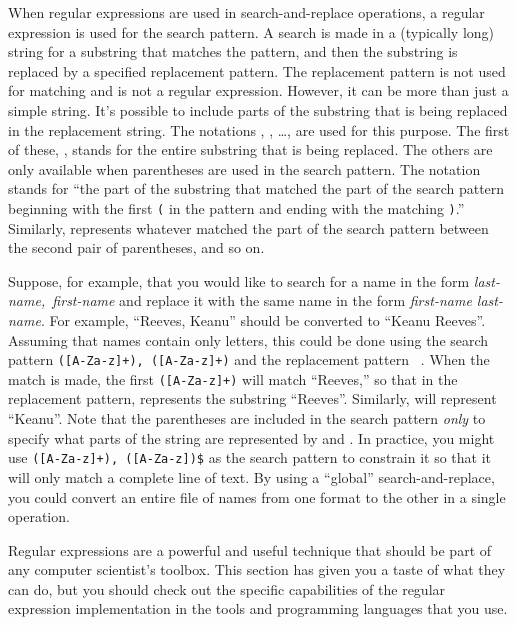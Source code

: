 When regular expressions are used in search-and-replace operations,
a regular expression is used for the search pattern.  A search is
made in a (typically long) string for a substring that matches the pattern,
and then the substring is replaced by a specified replacement
pattern.  The replacement pattern is not used for matching
and is not a regular expression.  However, it can be more than
just a simple string.  It's possible to include parts of the
substring that is being replaced in the replacement string.
The notations \texttt{}, \texttt{}, \dots, \texttt{}
are used for this purpose.  The first of these, \texttt{},
stands for the entire substring that is being replaced.
The others are only available when parentheses are used in
the search pattern.  The notation \texttt{} stands for
``the part of the substring that matched the part of the
search pattern beginning with the first \texttt{(} in the
pattern and ending with the matching \texttt{)}.''  Similarly,
\texttt{} represents whatever matched the part of the
search pattern between the second pair of parentheses, and so on.

Suppose, for example, that you would like to search for
a name in the form \textit{last-name,~first-name} and
replace it with the same name in the form \textit{first-name last-name}.
For example, ``Reeves, Keanu'' should be converted to ``Keanu Reeves''.
Assuming that names contain only letters,
this could be done using the search pattern \texttt{([A-Za-z]+),~([A-Za-z]+)}
and the replacement pattern \texttt{ }.  When the match is
made, the first \texttt{([A-Za-z]+)} will match ``Reeves,'' 
so that in the replacement pattern, \texttt{} represents the
substring ``Reeves''. Similarly, \texttt{} will represent
``Keanu''.  Note that the parentheses
are included in the search pattern \textit{only} to specify what parts
of the string are represented by \texttt{} and \texttt{}.
In practice, you might use \texttt{\sol([A-Za-z]+),~([A-Za-z])\$}
as the search pattern to constrain it so that it will only 
match a complete line of text.  By using a ``global'' search-and-replace,
you could convert an entire file of names from one format to the other
in a single operation.

\medskip

Regular expressions are a powerful and useful technique that
should be part of any computer scientist's toolbox.  This section
has given you a taste of what they can do, but you should check
out the specific capabilities of the regular expression implementation
in the tools and programming languages that you use.




